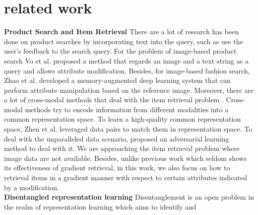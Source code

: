 \section{related work}
\label{sec:Related Work}
\textbf{Product Search and Item Retrieval}
There are a lot of research has been done on product searches by incorporating text into the query, such as \cite{JiangHX12MMdetection, HanWHZZLZD17ConceptDiscovery} use the user's feedback to the search query. For the problem of image-based product search Vo et al. \cite{Vo19TIRG} proposed a method that regards an image and a text string as a query and allows attribute modification. Besides, for image-based fashion search, Zhao et al. \cite{Zhao17MemoryFashionSearch} developed a memory-augmented deep learning system that can perform
attribute manipulation based on the reference image. Moreover, there are a lot of cross-modal methods that deal with the item retrieval problem \cite{Zhen19DSCMR, wen19advCrossModalIR, Yu19UnsupCrossModalIR}. Cross-modal methods try to encode information from different modalities into a common representation space. To learn a high-quality common representation space, Zhen et al. \cite{Zhen19DSCMR} leveraged data pairs to match them in representation space. To deal with the unparalleled data scenario, \cite{wen19advCrossModalIR} proposed an adversarial learning method to deal with it. We are approaching the item retrieval problem where image data are not available. Besides, unlike previous work which seldom shows its effectiveness of gradient retrieval, in this work, we also focus on how to retrieval items in a gradient manner with respect to certain attributes indicated by a modification.
\\
\textbf{Disentangled representation learning} 
Disentanglement is an open problem in the realm of representation learning which aims to identify and
